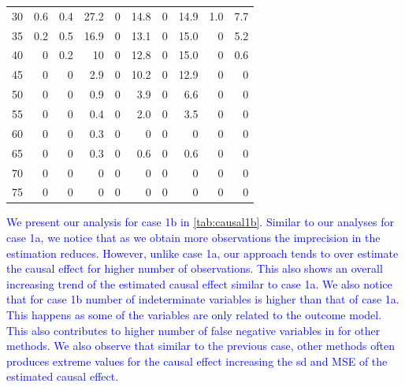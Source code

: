 \documentclass[preprint,12pt]{elsarticle}
\newcommand{\added}[1]{\textcolor{blue}{#1}}
\begin{document}
\begin{table}[ht]
\begin{tabular}{c|rrr|rr|rr|rr}
		30 & 0.6 & 0.4 & 27.2 & 0 & 14.8 & 0 & 14.9 & 1.0 & 7.7 \\ 
		35 & 0.2 & 0.5 & 16.9 & 0 & 13.1 & 0 & 15.0 & 0 & 5.2 \\ 
		40 & 0 & 0.2 & 10 & 0 & 12.8 & 0 & 15.0 & 0 & 0.6 \\ 
		45 & 0 & 0 & 2.9 & 0 & 10.2 & 0 & 12.9 & 0 & 0 \\ 
		50 & 0 & 0 & 0.9 & 0 & 3.9 & 0 & 6.6 & 0 & 0 \\ 
		55 & 0 & 0 & 0.4 & 0 & 2.0 & 0 & 3.5 & 0 & 0 \\ 
		60 & 0 & 0 & 0.3 & 0 & 0 & 0 & 0 & 0 & 0 \\ 
		65 & 0 & 0 & 0.3 & 0 & 0.6 & 0 & 0.6 & 0 & 0 \\ 
		70 & 0 & 0 & 0 & 0 & 0 & 0 & 0 & 0 & 0 \\ 
		75 & 0 & 0 & 0 & 0 & 0 & 0 & 0 & 0 & 0 \\ 
		\hline
	\end{tabular}
\end{table}

\added{We present our analysis for case 1b in \cref{tab:causal1b}. Similar to our analyses for case 1a, we notice that as we obtain more observations the imprecision in the estimation reduces. However, unlike case 1a, our approach tends to over estimate the causal effect for higher number of observations. This also shows an overall increasing trend of the estimated causal effect similar to case 1a. We also notice that for case 1b number of indeterminate variables is higher than that of case 1a. This happens as some of the variables are only related to the outcome model. This also contributes to higher number of false negative variables in for other methods. We also observe that similar to the previous case, other methods often produces extreme values for the causal effect increasing the sd and MSE of the estimated causal effect.}
\end{document}
